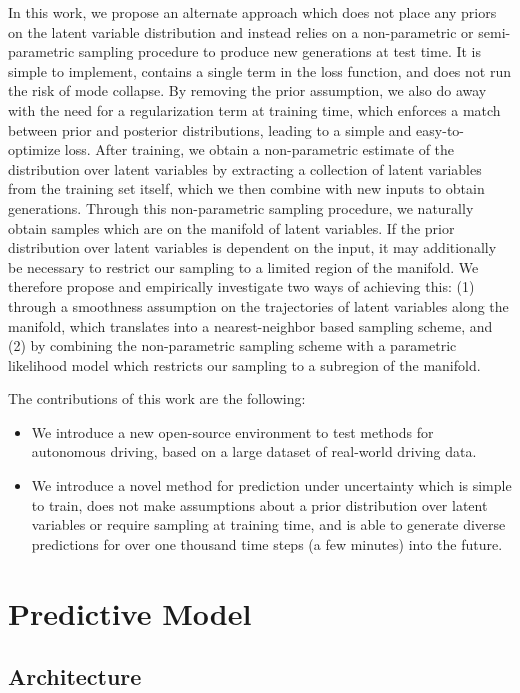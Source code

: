 \documentclass{article}
\begin{document}
In this work, we propose an alternate approach which does not place any priors on the latent variable distribution and instead relies on a non-parametric or semi-parametric sampling procedure to produce new generations at test time.
It is simple to implement, contains a single term in the loss function, and does not run the risk of mode collapse.
By removing the prior assumption, we also do away with the need for a regularization term at training time, which enforces a match between prior and posterior distributions, leading to a simple and easy-to-optimize loss.
After training, we obtain a non-parametric estimate of the distribution over latent variables by extracting a collection of latent variables from the training set itself, which we then combine with new inputs to obtain generations.
Through this non-parametric sampling procedure, we naturally obtain samples which are on the manifold of latent variables.
If the prior distribution over latent variables is dependent on the input, it may additionally be necessary to restrict our sampling to a limited region of the manifold.
We therefore propose and empirically investigate two ways of achieving this: (1) through a smoothness assumption on the trajectories of latent variables along the manifold, which translates into a nearest-neighbor based sampling scheme, and (2) by combining the non-parametric sampling scheme with a parametric likelihood model which restricts our sampling to a subregion of the manifold.

The contributions of this work are the following:
\begin{itemize}
\item We introduce a new open-source environment to test methods for autonomous driving, based on a large dataset of real-world driving data.
\item We introduce a novel method for prediction under uncertainty which is simple to train, does not make assumptions about a prior distribution over latent variables or require sampling at training time, and is able to generate diverse predictions for over one thousand time steps (a few minutes) into the future.
\end{itemize}



\section{Predictive Model}

\subsection{Architecture}
\end{document}
